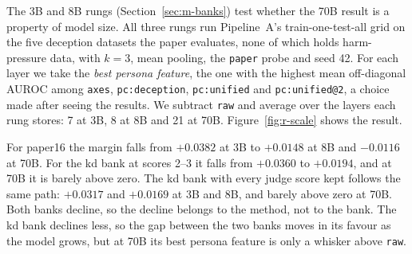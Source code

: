 The 3B and 8B rungs (Section~\ref{sec:m-banks}) test whether the 70B result is a property of model size.
All three rungs run Pipeline~A's train-one-test-all grid on the five deception datasets the paper evaluates, none of which holds harm-pressure data, with $k=3$, mean pooling, the \texttt{paper} probe and seed 42. %
For each layer we take the \emph{best persona feature}, the one with the highest mean off-diagonal AUROC among \texttt{axes}, \texttt{pc:deception}, \texttt{pc:unified} and \texttt{pc:unified@2}, a choice made after seeing the results. %
We subtract \texttt{raw} and average over the layers each rung stores: 7 at 3B, 8 at 8B and 21 at 70B. %
Figure~\ref{fig:r-scale} shows the result.

For paper16 the margin falls from $+0.0382$ at 3B to $+0.0148$ at 8B and $-0.0116$ at 70B. %
For the kd bank at scores 2--3 it falls from $+0.0360$ to $+0.0194$, and at 70B it is barely above zero. %
The kd bank with every judge score kept follows the same path: $+0.0317$ and $+0.0169$ at 3B and 8B, and barely above zero at 70B. %
Both banks decline, so the decline belongs to the method, not to the bank. %
The kd bank declines less, so the gap between the two banks moves in its favour as the model grows, but at 70B its best persona feature is only a whisker above \texttt{raw}. %

